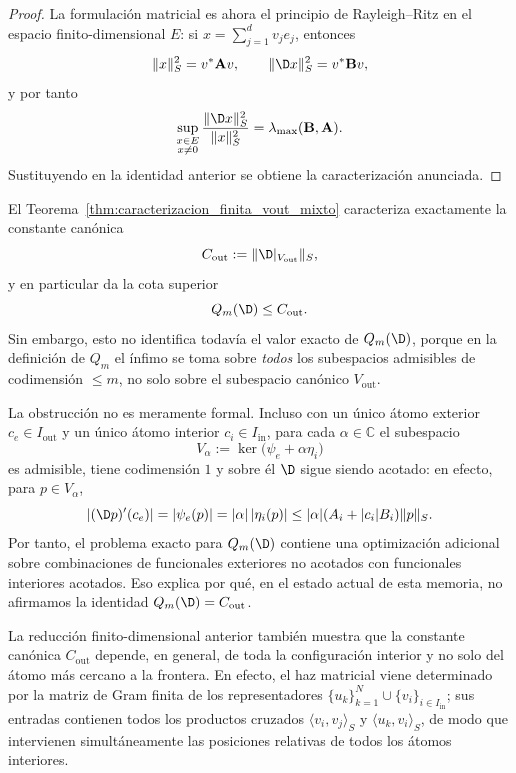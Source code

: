 \begin{proof}
	La formulación matricial es ahora el principio de Rayleigh--Ritz en el espacio finito-dimensional $E$: si $x=\sum_{j=1}^d v_j e_j$, entonces
	\[
		\|x\|_S^2=v^*\mathbf Av,
		\qquad
		\|\D x\|_S^2=v^*\mathbf Bv,
	\]
	y por tanto
	\[
		\sup_{\substack{x\in E\\x\neq0}}\frac{\|\D x\|_S^2}{\|x\|_S^2}
		=
		\lambda_{\max}(\mathbf B,\mathbf A).
	\]
	Sustituyendo en la identidad anterior se obtiene la caracterización anunciada.
\end{proof}

\begin{rmk}
	\label{rem:q_m_mixto_abierto_finito_dimensional}
	El Teorema~\ref{thm:caracterizacion_finita_vout_mixto} caracteriza exactamente la constante canónica
	\[
		C_{\mathrm{out}}:=\|\D|_{V_{\mathrm{out}}}\|_S,
	\]
	y en particular da la cota superior
	\[
		Q_m(\D)\le C_{\mathrm{out}}.
	\]
	Sin embargo, esto no identifica todavía el valor exacto de $Q_m(\D)$, porque en la definición de $Q_m$ el ínfimo se toma sobre \emph{todos} los subespacios admisibles de codimensión $\le m$, no solo sobre el subespacio canónico $V_{\mathrm{out}}$.

	La obstrucción no es meramente formal. Incluso con un único átomo exterior $c_e\in I_{\mathrm{out}}$ y un único átomo interior $c_i\in I_{\mathrm{in}}$, para cada $\alpha\in\mathbb C$ el subespacio
	\[
		V_{\alpha}:=\ker\bigl(\psi_e+\alpha\eta_i\bigr)
	\]
	es admisible, tiene codimensión $1$ y sobre él $\D$ sigue siendo acotado: en efecto, para $p\in V_{\alpha}$,
	\[
		|(\D p)'(c_e)|=|\psi_e(p)|=|\alpha|\,|\eta_i(p)|\le |\alpha|(A_i+|c_i|B_i)\|p\|_S.
	\]
	Por tanto, el problema exacto para $Q_m(\D)$ contiene una optimización adicional sobre combinaciones de funcionales exteriores no acotados con funcionales interiores acotados. Eso explica por qué, en el estado actual de esta memoria, no afirmamos la identidad $Q_m(\D)=C_{\mathrm{out}}$.

	La reducción finito-dimensional anterior también muestra que la constante canónica $C_{\mathrm{out}}$ depende, en general, de toda la configuración interior y no solo del átomo más cercano a la frontera. En efecto, el haz matricial viene determinado por la matriz de Gram finita de los representadores $\{u_k\}_{k=1}^N\cup\{v_i\}_{i\in I_{\mathrm{in}}}$; sus entradas contienen todos los productos cruzados $\langle v_i,v_j\rangle_S$ y $\langle u_k,v_i\rangle_S$, de modo que intervienen simultáneamente las posiciones relativas de todos los átomos interiores.
\end{rmk}


